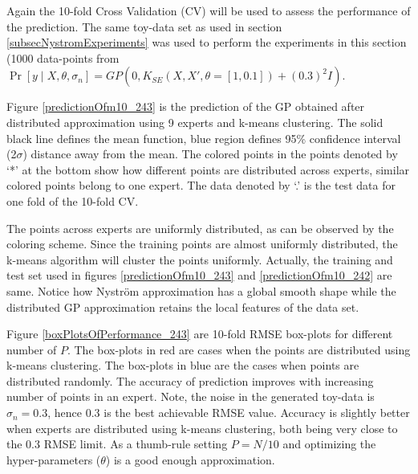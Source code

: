 Again the 10-fold Cross Validation (CV) will be used to assess the performance of the prediction. The same toy-data set as used in section \ref{subsecNystromExperiments} was used to perform the experiments in this section (1000 data-points from \(\Pr[y \mid X, \theta, \sigma_{n}] = GP(0, K_{SE}(X, X', \theta = [1, 0.1]) + (0.3)^{2}I)\).

Figure \ref{predictionOfm10_243} is the prediction of the GP obtained after distributed approximation using 9 experts and k-means clustering. The solid black line defines the mean function, blue region defines 95\% confidence interval (2\(\sigma\)) distance away from the mean. The colored points in the points denoted by `*' at the bottom show how different points are distributed across experts, similar colored points belong to one expert. The data denoted by `.' is the test data for one fold of the 10-fold CV. 

The points across experts are uniformly distributed, as can be observed by the coloring scheme. Since the training points are almost uniformly distributed, the k-means algorithm will cluster the points uniformly. Actually, the training and test set used in figures \ref{predictionOfm10_243} and \ref{predictionOfm10_242} are same. Notice how Nystr\"{o}m approximation has a global smooth shape while the distributed GP approximation retains the local features of the data set. 

Figure \ref{boxPlotsOfPerformance_243} are 10-fold RMSE box-plots for different number of \(P\). The box-plots in red are cases when the points are distributed using k-means clustering. The box-plots in blue are the cases when points are distributed randomly. The accuracy of prediction improves with increasing number of points in an expert. Note, the noise in the generated toy-data is \(\sigma_{n}=0.3\), hence \(0.3\) is the best achievable RMSE value. Accuracy is slightly better when experts are distributed using k-means clustering, both being very close to the \(0.3\) RMSE limit. As a thumb-rule setting \(P = N/10\) and optimizing the hyper-parameters (\(\theta\)) is a good enough approximation. 


